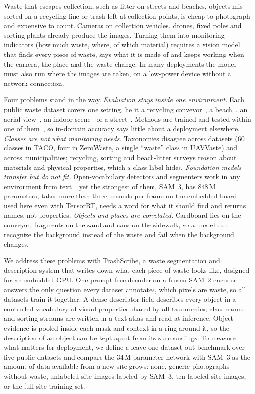 \documentclass[pdflatex,sn-basic,Numbered]{sn-jnl}%
\newcommand{\trashscribe}{TrashScribe}
\begin{document}
Waste that escapes collection, such as litter on streets and beaches, objects mis-sorted on a recycling line or trash left at collection points, is cheap to photograph and expensive to count. Cameras on collection vehicles, drones, fixed poles and sorting plants already produce the images. Turning them into monitoring indicators (how much waste, where, of which material) requires a vision model that finds every piece of waste, says what it is made of and keeps working when the camera, the place and the waste change. In many deployments the model must also run where the images are taken, on a low-power device without a network connection.

Four problems stand in the way. \emph{Evaluation stays inside one environment.} Each public waste dataset covers one setting, be it a recycling conveyor~\cite{bashkirova2022zerowaste}, a beach~\cite{bepli2023}, an aerial view~\cite{kraft2021uavvaste}, an indoor scene~\cite{wang2020mjuwaste} or a street~\cite{proenca2020taco,paulo2026streetview}. Methods are trained and tested within one of them~\cite{cosnet2025,javaid2026cluttered,aboubaker2023dontwaste}, so in-domain accuracy says little about a deployment elsewhere. \emph{Classes are not what monitoring needs.} Taxonomies disagree across datasets (60 classes in TACO, four in ZeroWaste, a single ``waste'' class in UAVVaste) and across municipalities; recycling, sorting and beach-litter surveys reason about materials and physical properties, which a class label hides. \emph{Foundation models transfer but do not fit.} Open-vocabulary detectors and segmenters work in any environment from text~\cite{liu2024groundingdino,carion2025sam3}, yet the strongest of them, SAM~3, has 848\,M parameters, takes more than three seconds per frame on the embedded board used here even with TensorRT, needs a word for what it should find and returns names, not properties. \emph{Objects and places are correlated.} Cardboard lies on the conveyor, fragments on the sand and cans on the sidewalk, so a model can recognize the background instead of the waste and fail when the background changes.

We address these problems with \trashscribe{}, a waste segmentation and description system that writes down what each piece of waste looks like, designed for an embedded GPU. One prompt-free decoder on a frozen SAM~2 encoder answers the only question every dataset annotates, which pixels are waste, so all datasets train it together. A dense descriptor field describes every object in a controlled vocabulary of visual properties shared by all taxonomies; class names and sorting streams are written in a text atlas and read at inference. Object evidence is pooled inside each mask and context in a ring around it, so the description of an object can be kept apart from its surroundings. To measure what matters for deployment, we define a leave-one-dataset-out benchmark over five public datasets and compare the 34\,M-parameter network with SAM~3 as the amount of data available from a new site grows: none, generic photographs without waste, unlabeled site images labeled by SAM~3, ten labeled site images, or the full site training set.
\end{document}
